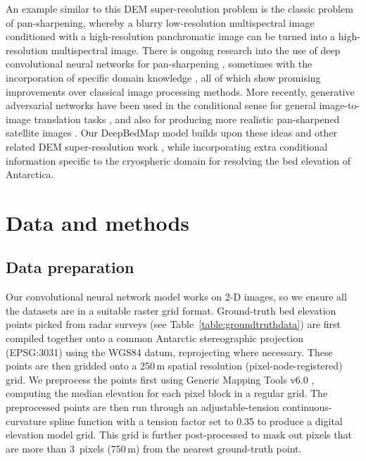 \documentclass[tc, noline]{copernicus}
\begin{document}
An example similar to this DEM super-resolution problem is the classic problem of pan-sharpening, whereby a blurry low-resolution multispectral image
conditioned with a high-resolution panchromatic image can be turned into a high-resolution multispectral image. There is ongoing research into the use
of deep convolutional neural networks for pan-sharpening
\citep{MasiPansharpeningConvolutionalNeural2016,ScarpaTargetAdaptiveCNNBasedPansharpening2018}, sometimes with the incorporation of specific
domain knowledge \citep{YangPanNetDeepNetwork2017}, all of which show promising improvements over classical image processing methods. More recently,
generative adversarial networks \citep{GoodfellowGenerativeAdversarialNetworks2014} have been used in the conditional sense for general image-to-image
translation tasks \citep[e.g.][]{IsolaImagetoImageTranslationConditional2016,ParkSemanticImageSynthesis2019}, and also for producing more realistic
pan-sharpened satellite images \citep{LiuPSGANGenerativeAdversarial2018}. Our DeepBedMap model builds upon these ideas and other related DEM
super-resolution work \citep{XuNonlocalsimilaritybased2015,ChenConvolutionalNeuralNetwork2016}, while incorporating extra conditional information
specific to the cryospheric domain for resolving the bed elevation of Antarctica.


\section{Data and methods}

\subsection{Data preparation} \label{section:datapreparation}

Our convolutional neural network model works on 2-D images, so we ensure all the datasets are in a suitable raster grid format. Ground-truth bed
elevation points picked from radar surveys (see Table~\ref{table:groundtruthdata}) are first compiled together onto a common Antarctic stereographic
projection (EPSG:3031) using the WGS84 datum, reprojecting where necessary. These points are then gridded onto a 250\,\unit{m} spatial resolution
(pixel-node-registered) grid. We preprocess the points first using Generic Mapping Tools v6.0 \citep[GMT6;][]{WesselGenericMappingTools2019},
computing the median elevation for each pixel block in a regular grid. The preprocessed points are then run through an adjustable-tension continuous-curvature spline function with a tension factor set to 0.35 to produce a digital elevation model grid. This grid is further post-processed to mask out
pixels that are more than 3~\unit{pixels} (750\,\unit{m}) from the nearest ground-truth point.
\end{document}
